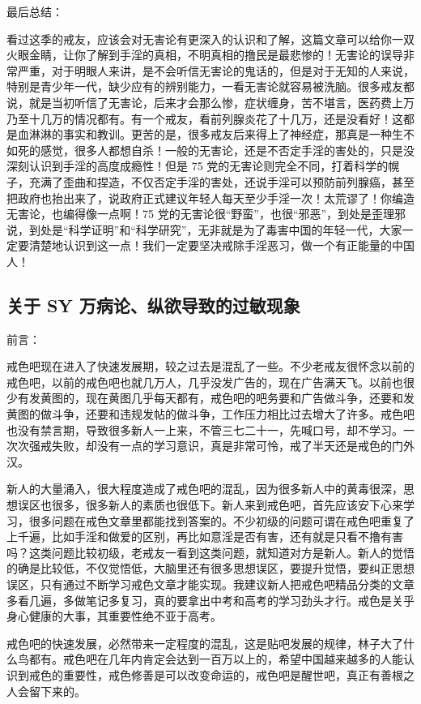 \documentclass{ctexart}
\begin{document}
最后总结：

看过这季的戒友，应该会对无害论有更深入的认识和了解，这篇文章可以给你一双火眼金睛，让你了解到手淫的真相，不明真相的撸民是最悲惨的！无害论的误导非常严重，对于明眼人来讲，是不会听信无害论的鬼话的，但是对于无知的人来说，特别是青少年一代，缺少应有的辨别能力，一看无害论就容易被洗脑。很多戒友都说，就是当初听信了无害论，后来才会那么惨，症状缠身，苦不堪言，医药费上万乃至十几万的情况都有。有一个戒友，看前列腺炎花了十几万，还是没看好！这都是血淋淋的事实和教训。更苦的是，很多戒友后来得上了神经症，那真是一种生不如死的感觉，很多人都想自杀！一般的无害论，还是不否定手淫的害处的，只是没深刻认识到手淫的高度成瘾性！但是 75 党的无害论则完全不同，打着科学的幌子，充满了歪曲和捏造，不仅否定手淫的害处，还说手淫可以预防前列腺癌，甚至把政府也抬出来了，说政府正式建议年轻人每天至少手淫一次！太荒谬了！你编造无害论，也编得像一点啊！75 党的无害论很“野蛮”，也很“邪恶”，到处是歪理邪说，到处是“科学证明”和“科学研究”，无非就是为了毒害中国的年轻一代，大家一定要清楚地认识到这一点！我们一定要坚决戒除手淫恶习，做一个有正能量的中国人！

\subsection{关于 SY 万病论、纵欲导致的过敏现象}

前言：

戒色吧现在进入了快速发展期，较之过去是混乱了一些。不少老戒友很怀念以前的戒色吧，以前的戒色吧也就几万人，几乎没发广告的，现在广告满天飞。以前也很少有发黄图的，现在黄图几乎每天都有，戒色吧的吧务要和广告做斗争，还要和发黄图的做斗争，还要和违规发帖的做斗争，工作压力相比过去增大了许多。戒色吧也没有禁言期，导致很多新人一上来，不管三七二十一，先喊口号，却不学习。一次次强戒失败，却没有一点的学习意识，真是非常可怜，戒了半天还是戒色的门外汉。

新人的大量涌入，很大程度造成了戒色吧的混乱，因为很多新人中的黄毒很深，思想误区也很多，很多新人的素质也很低下。新人来到戒色吧，首先应该安下心来学习，很多问题在戒色文章里都能找到答案的。不少初级的问题可谓在戒色吧重复了上千遍，比如手淫和做爱的区别，再比如意淫是否有害，还有就是只看不撸有害吗？这类问题比较初级，老戒友一看到这类问题，就知道对方是新人。新人的觉悟的确是比较低，不仅觉悟低，大脑里还有很多思想误区，要提升觉悟，要纠正思想误区，只有通过不断学习戒色文章才能实现。我建议新人把戒色吧精品分类的文章多看几遍，多做笔记多复习，真的要拿出中考和高考的学习劲头才行。戒色是关乎身心健康的大事，其重要性绝不亚于高考。

戒色吧的快速发展，必然带来一定程度的混乱，这是贴吧发展的规律，林子大了什么鸟都有。戒色吧在几年内肯定会达到一百万以上的，希望中国越来越多的人能认识到戒色的重要性，戒色修善是可以改变命运的，戒色吧是醒世吧，真正有善根之人会留下来的。
\end{document}

